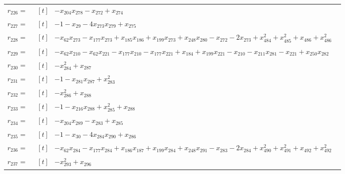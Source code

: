 \begin{longtable}{@{}r p{0.92\linewidth}@{}}
$r_{226}=$ & $\begin{aligned}[t]&-x_{204}x_{278}-x_{272}+x_{274}\end{aligned}$ \\[2pt]
$r_{227}=$ & $\begin{aligned}[t]&-1-x_{29}-4x_{273}x_{279}+x_{275}\end{aligned}$ \\[2pt]
$r_{228}=$ & $\begin{aligned}[t]&-x_{62}x_{273}-x_{177}x_{273}+x_{185}x_{186}+x_{199}x_{273}+x_{248}x_{280}-x_{272}-2x_{273}+x_{484}^{2}+x_{485}^{2}+x_{486}+x_{486}^{2}\end{aligned}$ \\[2pt]
$r_{229}=$ & $\begin{aligned}[t]&-x_{62}x_{210}-x_{62}x_{221}-x_{177}x_{210}-x_{177}x_{221}+x_{184}+x_{199}x_{221}-x_{210}-x_{211}x_{281}-x_{221}+x_{250}x_{282}\end{aligned}$ \\[2pt]
$r_{230}=$ & $\begin{aligned}[t]&-x_{284}^{2}+x_{287}\end{aligned}$ \\[2pt]
$r_{231}=$ & $\begin{aligned}[t]&-1-x_{281}x_{287}+x_{283}^{2}\end{aligned}$ \\[2pt]
$r_{232}=$ & $\begin{aligned}[t]&-x_{286}^{2}+x_{288}\end{aligned}$ \\[2pt]
$r_{233}=$ & $\begin{aligned}[t]&-1-x_{216}x_{288}+x_{285}^{2}+x_{288}\end{aligned}$ \\[2pt]
$r_{234}=$ & $\begin{aligned}[t]&-x_{204}x_{289}-x_{283}+x_{285}\end{aligned}$ \\[2pt]
$r_{235}=$ & $\begin{aligned}[t]&-1-x_{30}-4x_{284}x_{290}+x_{286}\end{aligned}$ \\[2pt]
$r_{236}=$ & $\begin{aligned}[t]&-x_{62}x_{284}-x_{177}x_{284}+x_{186}x_{187}+x_{199}x_{284}+x_{248}x_{291}-x_{283}-2x_{284}+x_{490}^{2}+x_{491}^{2}+x_{492}+x_{492}^{2}\end{aligned}$ \\[2pt]
$r_{237}=$ & $\begin{aligned}[t]&-x_{293}^{2}+x_{296}\end{aligned}$ \\[2pt]

\end{longtable}
